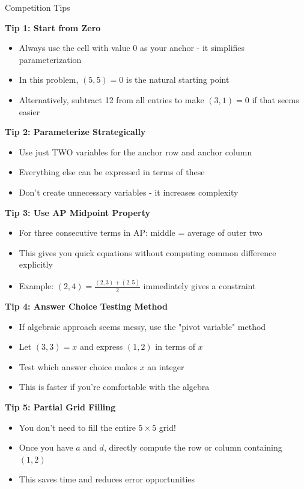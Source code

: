 \documentclass[12pt]{article}
\begin{document}
\begin{protipbox}{Competition Tips}

\textbf{Tip 1: Start from Zero}
\begin{itemize}
    \item Always use the cell with value 0 as your anchor - it simplifies parameterization
    \item In this problem, $(5,5) = 0$ is the natural starting point
    \item Alternatively, subtract 12 from all entries to make $(3,1) = 0$ if that seems easier
\end{itemize}

\textbf{Tip 2: Parameterize Strategically}
\begin{itemize}
    \item Use just TWO variables for the anchor row and anchor column
    \item Everything else can be expressed in terms of these
    \item Don't create unnecessary variables - it increases complexity
\end{itemize}

\textbf{Tip 3: Use AP Midpoint Property}
\begin{itemize}
    \item For three consecutive terms in AP: middle = average of outer two
    \item This gives you quick equations without computing common difference explicitly
    \item Example: $(2,4) = \frac{(2,3) + (2,5)}{2}$ immediately gives a constraint
\end{itemize}

\textbf{Tip 4: Answer Choice Testing Method}
\begin{itemize}
    \item If algebraic approach seems messy, use the "pivot variable" method
    \item Let $(3,3) = x$ and express $(1,2)$ in terms of $x$
    \item Test which answer choice makes $x$ an integer
    \item This is faster if you're comfortable with the algebra
\end{itemize}

\textbf{Tip 5: Partial Grid Filling}
\begin{itemize}
    \item You don't need to fill the entire $5 \times 5$ grid!
    \item Once you have $a$ and $d$, directly compute the row or column containing $(1,2)$
    \item This saves time and reduces error opportunities
\end{itemize}


\end{protipbox}
\end{document}

